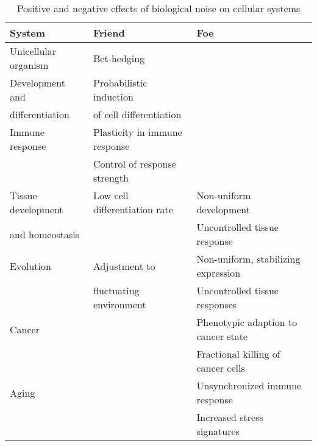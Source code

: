 \begin{table}[hb	]
\centering
\caption{Positive and negative effects of biological noise on cellular systems}
\label{table:effects_noise}
\begin{tabular}{l l l}
\toprule
\toprule
System & Friend & Foe \\ 
\midrule
\midrule
Unicellular organism & Bet-hedging & \\
\midrule
Development and & Probabilistic induction  & \\
differentiation & of cell differentiation & \\
\midrule
Immune response & Plasticity in immune response & \\
 & Control of response strength &   \\
\midrule
Tissue development  & Low cell differentiation rate & Non-uniform development \\ 
and homeostasis &  & Uncontrolled tissue response \\
\midrule
Evolution & Adjustment to  & Non-uniform, stabilizing expression \\ 
& fluctuating environment & Uncontrolled tissue responses \\
\midrule
Cancer &  & Phenotypic adaption to cancer state \\
& & Fractional killing of cancer cells \\
\midrule
Aging &  & Unsynchronized immune response \\
& & Increased stress signatures \\ 
\bottomrule
\bottomrule
\end{tabular}
\end{table}
